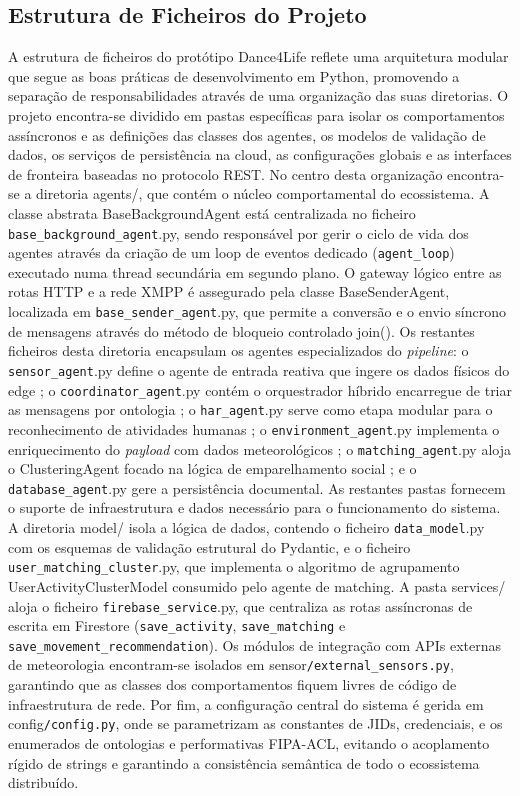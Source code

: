 \documentclass[runningheads]{llncs}
\begin{document}
\subsection{Estrutura de Ficheiros do Projeto}
A estrutura de ficheiros do protótipo Dance4Life reflete uma arquitetura modular que segue as boas práticas de desenvolvimento em Python, promovendo a separação de responsabilidades através de uma organização das suas diretorias. O projeto encontra-se dividido em pastas específicas para isolar os comportamentos assíncronos e as definições das classes dos agentes, os modelos de validação de dados, os serviços de persistência na cloud, as configurações globais e as interfaces de fronteira baseadas no protocolo REST.  
No centro desta organização encontra-se a diretoria agents/, que contém o núcleo comportamental do ecossistema. A classe abstrata BaseBackgroundAgent está centralizada no ficheiro \texttt{base\_background\_agent}.py, sendo responsável por gerir o ciclo de vida dos agentes através da criação de um loop de eventos dedicado (\texttt{agent\_loop}) executado numa thread secundária em segundo plano. O gateway lógico entre as rotas HTTP e a rede XMPP é assegurado pela classe BaseSenderAgent, localizada em \texttt{base\_sender\_agent}.py, que permite a conversão e o envio síncrono de mensagens através do método de bloqueio controlado join(). Os restantes ficheiros desta diretoria encapsulam os agentes especializados do \textit{pipeline}: o \texttt{sensor\_agent}.py define o agente de entrada reativa que ingere os dados físicos do edge ; o \texttt{coordinator\_agent}.py contém o orquestrador híbrido encarregue de triar as mensagens por ontologia ; o \texttt{har\_agent}.py serve como etapa modular para o reconhecimento de atividades humanas ; o \texttt{environment\_agent}.py implementa o enriquecimento do \textit{payload} com dados meteorológicos ; o \texttt{matching\_agent}.py aloja o ClusteringAgent focado na lógica de emparelhamento social ; e o \texttt{database\_agent}.py gere a persistência documental.  
As restantes pastas fornecem o suporte de infraestrutura e dados necessário para o funcionamento do sistema. A diretoria model/ isola a lógica de dados, contendo o ficheiro \texttt{data\_model}.py com os esquemas de validação estrutural do Pydantic, e o ficheiro \texttt{user\_matching\_cluster}.py, que implementa o algoritmo de agrupamento UserActivityClusterModel consumido pelo agente de matching. A pasta services/ aloja o ficheiro \texttt{firebase\_service}.py, que centraliza as rotas assíncronas de escrita em Firestore (\texttt{save\_activity}, \texttt{save\_matching} e \texttt{save\_movement\_recommendation}). Os módulos de integração com APIs externas de meteorologia encontram-se isolados em sensor\texttt{/external\_sensors.py}, garantindo que as classes dos comportamentos fiquem livres de código de infraestrutura de rede. Por fim, a configuração central do sistema é gerida em config\texttt{/config.py}, onde se parametrizam as constantes de JIDs, credenciais, e os enumerados de ontologias e performativas FIPA-ACL, evitando o acoplamento rígido de strings e garantindo a consistência semântica de todo o ecossistema distribuído. 
\end{document}
